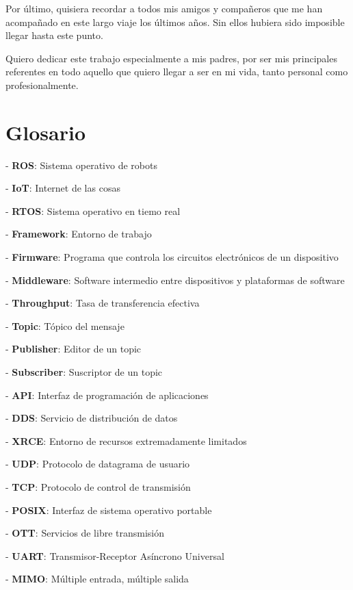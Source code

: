 \documentclass[a4paper,11pt,spanish]{sphinxmanual}
\newcommand\blankpage{%
    \null
    \thispagestyle{empty}%
    \newpage}
\begin{document}
Por último, quisiera recordar a todos mis amigos y compañeros que me han acompañado en este largo viaje los últimos años. Sin ellos hubiera sido imposible llegar hasta este punto.

Quiero dedicar este trabajo especialmente a mis padres, por ser mis principales referentes en todo aquello que quiero llegar a ser en mi vida, tanto personal como profesionalmente.

\afterpage{\blankpage}

\newpage
\thispagestyle{empty}
\section*{Glosario}


- \textbf{ROS}: Sistema operativo de robots

- \textbf{IoT}: Internet de las cosas

- \textbf{RTOS}: Sistema operativo en tiemo real

- \textbf{Framework}: Entorno de trabajo

- \textbf{Firmware}: Programa que controla los circuitos electrónicos de un dispositivo

- \textbf{Middleware}: Software intermedio entre dispositivos y plataformas de software

- \textbf{Throughput}: Tasa de transferencia efectiva

- \textbf{Topic}: Tópico del mensaje

- \textbf{Publisher}: Editor de un topic

- \textbf{Subscriber}: Suscriptor de un topic

- \textbf{API}: Interfaz de programación de aplicaciones

- \textbf{DDS}: Servicio de distribución de datos

- \textbf{XRCE}: Entorno de recursos extremadamente limitados

- \textbf{UDP}: Protocolo de datagrama de usuario

- \textbf{TCP}: Protocolo de control de transmisión

- \textbf{POSIX}: Interfaz de sistema operativo portable

- \textbf{OTT}: Servicios de libre transmisión

- \textbf{UART}: Transmisor-Receptor Asíncrono Universal

- \textbf{MIMO}: Múltiple entrada, múltiple salida
\end{document}
